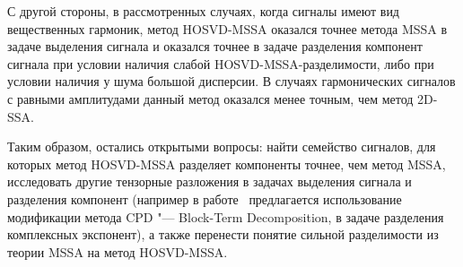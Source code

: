 \documentclass[specialist,
    substylefile = spbu.rtx,
    subf,href,colorlinks=true, 12pt]{disser}
\theoremstyle{plain}
\theoremstyle{definition}
\theoremstyle{remark}
\begin{document}
    С другой стороны, в рассмотренных случаях, когда сигналы имеют вид вещественных гармоник, метод HOSVD-MSSA оказался
    точнее метода MSSA в задаче выделения сигнала и оказался точнее в задаче разделения компонент сигнала
    при условии наличия слабой HOSVD-MSSA-разделимости, либо при условии наличия у шума большой дисперсии.
    В случаях гармонических сигналов с равными амплитудами данный метод оказался менее точным, чем метод 2D-SSA.

    Таким образом, остались открытыми вопросы: найти семейство сигналов, для которых метод HOSVD-MSSA
    разделяет компоненты точнее, чем метод MSSA, исследовать другие тензорные разложения в задачах выделения сигнала
    и разделения компонент (например в работе~\cite{cpd-separation} предлагается использование модификации метода CPD
    "--- Block-Term Decomposition, в задаче разделения комплексных экспонент), а также
    перенести понятие сильной разделимости из теории MSSA на метод HOSVD-MSSA.

    
    
\end{document}
